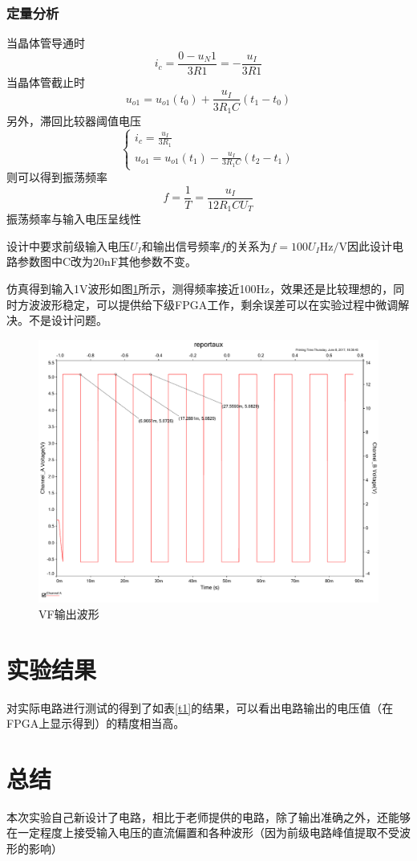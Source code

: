 \documentclass[UTF8,a4paper]{paper}
\begin{document}
\subsubsection{定量分析}
当晶体管导通时
$$i_c=\frac{0-u_N1}{3R1}=-\frac{u_I}{3R1}$$
当晶体管截止时
$$u_{o1} = u_{o1}(t_0)+\frac{u_I}{3R_1C}(t_1-t_0)$$
另外，滞回比较器阈值电压
$$\begin{cases}
i_c = \frac{u_I}{3R_1}\\
u_{o1} = u_{o1}(t_1)-\frac{u_I}{3R_1C}(t_2-t_1)
\end{cases}$$
则可以得到振荡频率
$$f=\frac{1}{T}=\frac{u_I}{12R_1CU_T}$$
振荡频率与输入电压呈线性

设计中要求前级输入电压$U_I$和输出信号频率$f$的关系为$f = 100 U_I \mathrm{Hz/V}$因此设计电路参数图中C改为20nF其他参数不变。

仿真得到输入1V波形如图\ref{f6}所示，测得频率接近100Hz，效果还是比较理想的，同时方波波形稳定，可以提供给下级FPGA工作，剩余误差可以在实验过程中微调解决。不是设计问题。

\begin{figure}[h]
\centering
\includegraphics[width=\textwidth]{f6.pdf}
\caption{VF输出波形}
\label{f6}
\end{figure}

\section{实验结果}
对实际电路进行测试的得到了如表\ref{t1}的结果，可以看出电路输出的电压值（在FPGA上显示得到）的精度相当高。

\section{总结}
本次实验自己新设计了电路，相比于老师提供的电路，除了输出准确之外，还能够在一定程度上接受输入电压的直流偏置和各种波形（因为前级电路峰值提取不受波形的影响）
\end{document}
